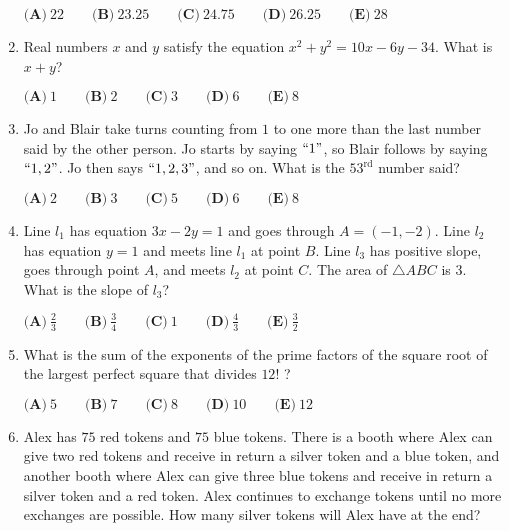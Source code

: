 \documentclass{article}
\begin{document}
\begin{enumerate}[label=\arabic*., itemsep=0.5em]
$\textbf{(A)}\ 22 \qquad \textbf{(B)}\ 23.25 \qquad \textbf{(C)}\ 24.75 \qquad \textbf{(D)}\ 26.25 \qquad \textbf{(E)}\ 28$\par \vspace{0.5em}\item Real numbers $x$ and $y$ satisfy the equation $x^2 + y^2 = 10x - 6y - 34$. What is $x + y$?

$\textbf{(A)}\ 1 \qquad \textbf{(B)}\ 2 \qquad \textbf{(C)}\ 3 \qquad \textbf{(D)}\ 6 \qquad \textbf{(E)}\ 8$\par \vspace{0.5em}\item Jo and Blair take turns counting from $1$ to one more than the last number said by the other person. Jo starts by saying $``1"$, so Blair follows by saying $``1, 2"$. Jo then says $``1, 2, 3"$, and so on. What is the $53^{\text{rd}}$ number said?

$\textbf{(A)}\ 2 \qquad \textbf{(B)}\ 3 \qquad \textbf{(C)}\ 5 \qquad \textbf{(D)}\ 6 \qquad \textbf{(E)}\ 8$\par \vspace{0.5em}\item Line $l_1$ has equation $3x - 2y = 1$ and goes through $A = (-1, -2)$. Line $l_2$ has equation $y = 1$ and meets line $l_1$ at point $B$. Line $l_3$ has positive slope, goes through point $A$, and meets $l_2$ at point $C$. The area of $\triangle ABC$ is $3$. What is the slope of $l_3$?

$\textbf{(A)}\ \frac{2}{3} \qquad \textbf{(B)}\ \frac{3}{4} \qquad \textbf{(C)}\ 1 \qquad \textbf{(D)}\ \frac{4}{3} \qquad \textbf{(E)}\ \frac{3}{2}$\par \vspace{0.5em}\item What is the sum of the exponents of the prime factors of the square root of the largest perfect square that divides $12!$ ?

$\textbf{(A)}\ 5 \qquad \textbf{(B)}\ 7 \qquad \textbf{(C)}\ 8 \qquad \textbf{(D)}\ 10 \qquad \textbf{(E)}\ 12 $\par \vspace{0.5em}\item Alex has $75$ red tokens and $75$ blue tokens. There is a booth where Alex can give two red tokens and receive in return a silver token and a blue token, and another booth where Alex can give three blue tokens and receive in return a silver token and a red token. Alex continues to exchange tokens until no more exchanges are possible. How many silver tokens will Alex have at the end?


\end{enumerate}
\end{document}
